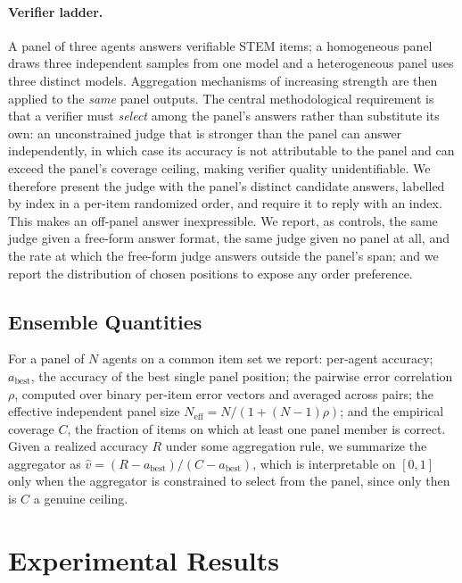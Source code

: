 \documentclass[manuscript,screen,review]{acmart}
\begin{document}
{\paragraph{Verifier ladder.} A panel of three agents answers verifiable STEM
items; a homogeneous panel draws three independent samples from one model and a
heterogeneous panel uses three distinct models. Aggregation mechanisms of
increasing strength are then applied to the \emph{same} panel outputs. The
central methodological requirement is that a verifier must \emph{select} among
the panel's answers rather than substitute its own: an unconstrained judge that
is stronger than the panel can answer independently, in which case its accuracy
is not attributable to the panel and can exceed the panel's coverage ceiling,
making verifier quality unidentifiable. We therefore present the judge with the
panel's distinct candidate answers, labelled by index in a per-item randomized
order, and require it to reply with an index. This makes an off-panel answer
inexpressible. We report, as controls, the same judge given a free-form answer
format, the same judge given no panel at all, and the rate at which the free-form
judge answers outside the panel's span; and we report the distribution of chosen
positions to expose any order preference.

\subsection{Ensemble Quantities}
\label{sec:methods-ensemble}
For a panel of $N$ agents on a common item set we report: per-agent accuracy;
$a_{\mathrm{best}}$, the accuracy of the best single panel position; the pairwise
error correlation $\rho$, computed over binary per-item error vectors and averaged
across pairs; the effective independent panel size
$N_{\mathrm{eff}} = N / (1 + (N-1)\rho)$; and the empirical coverage $C$, the
fraction of items on which at least one panel member is correct. Given a realized
accuracy $R$ under some aggregation rule, we summarize the aggregator as
$\hat v = (R - a_{\mathrm{best}}) / (C - a_{\mathrm{best}})$, which is
interpretable on $[0,1]$ only when the aggregator is constrained to select from
the panel, since only then is $C$ a genuine ceiling.
}%
\section{Experimental Results}
\end{document}
